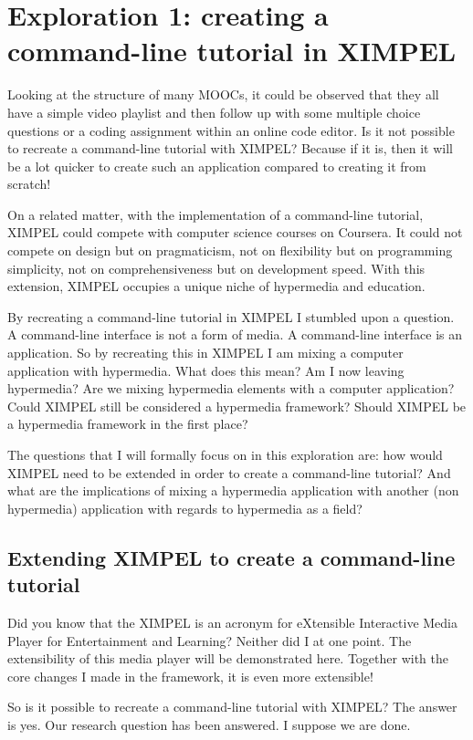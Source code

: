 \chapter{Exploration 1: creating a command-line tutorial in XIMPEL}
\label{chap:exploration1}
Looking at the structure of many MOOCs, it could be observed that they all have a simple video playlist and then follow up with some multiple choice questions or a coding assignment within an online code editor. Is it not possible to recreate a command-line tutorial with XIMPEL? Because if it is, then it will be a lot quicker to create such an application compared to creating it from scratch!

On a related matter, with the implementation of a command-line tutorial, XIMPEL could compete with computer science courses on Coursera. It could not compete on design but on pragmaticism, not on flexibility but on programming simplicity, not on comprehensiveness but on development speed. With this extension, XIMPEL occupies a unique niche of hypermedia and education.

By recreating a command-line tutorial in XIMPEL I stumbled upon a question. A command-line interface is not a form of media. A command-line interface is an application. So by recreating this in XIMPEL I am mixing a computer application with hypermedia. What does this mean? Am I now leaving hypermedia? Are we mixing hypermedia elements with a computer application? Could XIMPEL still be considered a hypermedia framework? Should XIMPEL be a hypermedia framework in the first place? 

The questions that I will formally focus on in this exploration are: how would XIMPEL need to be extended in order to create a command-line tutorial? And what are the implications of mixing a hypermedia application with another (non hypermedia) application with regards to hypermedia as a field?

\section{Extending XIMPEL to create a command-line tutorial}
Did you know that the XIMPEL is an acronym for eXtensible Interactive Media Player for Entertainment and Learning? Neither did I at one point. The extensibility of this media player will be demonstrated here. Together with the core changes I made in the framework, it is even more extensible!

So is it possible to recreate a command-line tutorial with XIMPEL? The answer is yes. Our research question has been answered. I suppose we are done.

